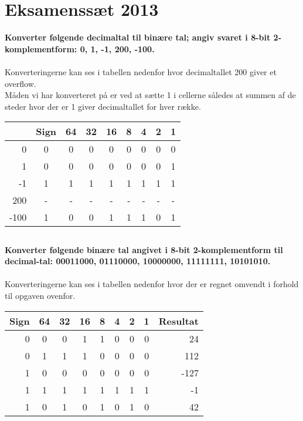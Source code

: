 \documentclass[a4paper,11pt]{article}
\begin{document}
\section*{Eksamenssæt 2013}
\textbf{Konverter følgende decimaltal til binære tal; angiv svaret i 8-bit 2-komplementform: 0, 1, -1, 200, -100.}
\\\\
Konverteringerne kan ses i tabellen nedenfor hvor decimaltallet 200 giver et overflow.\\
Måden vi har konverteret på er ved at sætte 1 i cellerne således at summen af de steder hvor der er 1 giver decimaltallet for hver række. 
\begin{center}
\begin{tabular}{| r | c | c | c | c | c | c | c | c |}
\hline
        & Sign  & 64 & 32 & 16 & 8 & 4 & 2 & 1\\\hline
  0         & 0         & 0 & 0 & 0 & 0 & 0 & 0 & 0 \\\hline
  1         & 0         & 0 & 0 & 0 & 0 & 0 & 0 & 1\\\hline
  -1        & 1         & 1 & 1 & 1 & 1 & 1 & 1 & 1 \\\hline
  200       & -         & - & - & - & - & - & - & -\\\hline
  -100  & 1         & 0 & 0 & 1 & 1 & 1 & 0 & 1\\ \hline
\end{tabular}
\end{center}


\subsection*{}
\textbf{Konverter følgende binære tal angivet i 8-bit 2-komplementform til decimal-tal: 00011000, 01110000, 10000000, 11111111, 10101010.}
\\\\
Konverteringerne kan ses i tabellen nedenfor hvor der er regnet omvendt i forhold til opgaven ovenfor.
\begin{center}
\begin{tabular}{| r | c | c | c | c | c | c | c | r |}
\hline
Sign    & 64    & 32 & 16 & 8 & 4 & 2 & 1 & Resultat\\\hline
0       & 0         & 0 & 1 & 1 & 0 & 0 & 0 & 24 \\\hline
0       & 1         & 1 & 1 & 0 & 0 & 0 & 0 & 112\\\hline
1       & 0         & 0 & 0 & 0 & 0 & 0 & 0 & -127 \\\hline
1       & 1         & 1 & 1 & 1 & 1 & 1 & 1 & -1\\\hline
1       & 0         & 1 & 0 & 1 & 0 & 1 & 0 & 42\\ \hline
\end{tabular}
\end{center}
\end{document}
